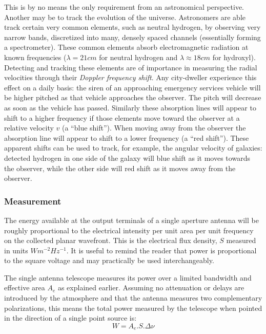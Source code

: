 \documentclass[a4paper,10pt]{report}
\begin{document}
This is by no means the only requirement from an astronomical perspective. Another may be to track the evolution of the universe. Astronomers are able
track certain very common elements, such as neutral hydrogen, by observing very narrow bands, discretized into many, densely spaced 
channels (essentially forming a spectrometer). These common elements absorb electromagnetic radiation at known frequencies ($\lambda = 21 cm$ for neutral hydrogen and
$\lambda \approx 18 cm$ for hydroxyl). Detecting and tracking these elements are of importance in measuring the radial velocities through their \textit{Doppler frequency shift}.
Any city-dweller experience this effect on a daily basis: the siren of an approaching emergency services vehicle will be higher pitched as that vehicle
approaches the observer. The pitch will decrease as soon as the vehicle has passed. Similarly these absorption lines will appear to shift to a higher
frequency if those elements move toward the observer at a relative velocity $v$ (a ``blue shift''). When moving away from the observer the absorption 
line will appear to shift to a lower frequency (a ``red shift''). These apparent shifts can be used to track, for example, the angular velocity of 
galaxies: detected hydrogen in one side of the galaxy will blue shift as it moves towards the observer, while the other side will red shift as it moves away from the observer.

\subsubsection{Measurement}
The energy available at the output terminals of a single aperture antenna will be roughly proportional to the electrical intensity per unit area per unit frequency on the 
collected planar wavefront. This is the electrical flux density, $S$ measured in units $Wm^{-2}Hz^{-1}$. It is useful to remind the reader that power is proportional to the square voltage and may 
practically be used interchangeably.

The single antenna telescope measures its power over a limited bandwidth and effective area $A_e$ as explained earlier. Assuming
no attenuation or delays are introduced by the atmosphere and that the antenna measures two complementary polarizations, this 
means the total power measured by the telescope when pointed in the direction of a single point source is: 
\begin{equation*}
W = A_e.S.\Delta\nu
\end{equation*}
\end{document}
